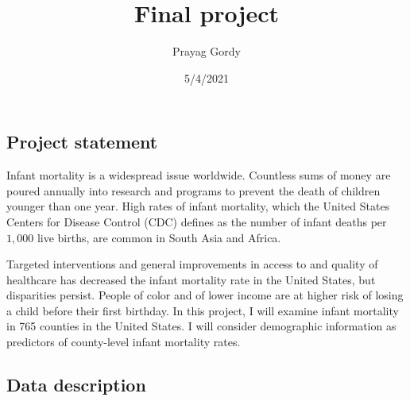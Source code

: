 \documentclass[]{article}
\title{Final project}
\author{Prayag Gordy}
\date{5/4/2021}
\begin{document}
\maketitle

\hypertarget{project-statement}{%
\subsection{Project statement}\label{project-statement}}

Infant mortality is a widespread issue worldwide. Countless sums of
money are poured annually into research and programs to prevent the
death of children younger than one year. High rates of infant mortality,
which the United States Centers for Disease Control (CDC) defines as the
number of infant deaths per \(1,000\) live births, are common in South
Asia and Africa.

Targeted interventions and general improvements in access to and quality
of healthcare has decreased the infant mortality rate in the United
States, but disparities persist. People of color and of lower income are
at higher risk of losing a child before their first birthday. In this
project, I will examine infant mortality in 765 counties in the United
States. I will consider demographic information as predictors of
county-level infant mortality rates.

\hypertarget{data-description}{%
\subsection{Data description}\label{data-description}}
\end{document}
